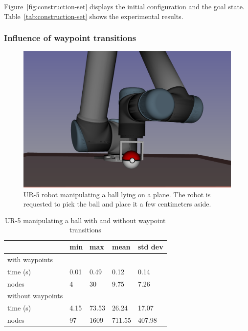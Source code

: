 Figure~\ref{fig:construction-set} displays the initial configuration and the
goal state. Table~\ref{tab:construction-set} shows the experimental results.

\subsubsection{Influence of waypoint transitions}

\begin{figure}
  \begin{center}
    \includegraphics[width=\linewidth]{figures/ur5-grasps-pokeball.png}
  \end{center}
  \caption{UR-5 robot manipulating a ball lying on a plane. The robot is requested to pick the ball and place it a few centimeters aside.}
  \label{fig:ur5-pokeball}
\end{figure}

\begin{table}
  \begin{center}
  \begin{tabular}{|l|l|l|l|l|}
    \hline
    & min & max & mean & std dev \\
    \hline
    with waypoints&&&&\\
    time (s) & 0.01 & 0.49 & 0.12 & 0.14 \\
    nodes & 4 &  30 & 9.75 & 7.26\\
    \hline
    without waypoints&&&&\\
    time (s) & 4.15 & 73.53 & 26.24 & 17.07 \\
    nodes & 97 &  1609 & 711.55 & 407.98\\
    \hline
  \end{tabular}
  \end{center}
  \caption{UR-5 manipulating a ball with and without waypoint transitions}
  \label{tab:waypoint}
\end{table}

